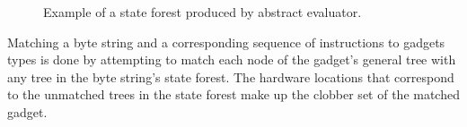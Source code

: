     \begin{figure}
        \centering
        \caption{Example of a state forest produced by abstract evaluator.}
        \label{fig:method-general-trees}
    \end{figure}

    Matching a byte string and a corresponding sequence of instructions to
    gadgets types is done by attempting to match each node of the gadget's
    general tree with any tree in the byte string's state forest. The hardware
    locations that correspond to the unmatched trees in the state forest make up
    the clobber set of the matched gadget.

